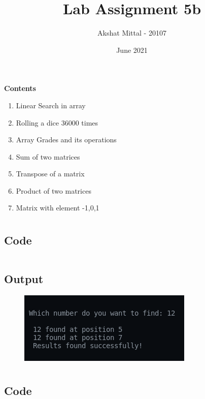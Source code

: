 \documentclass[12pt]{article}
\title{Lab Assignment 5b}
\author{Akshat Mittal - 20107}
\date{June 2021}
\begin{document}
\maketitle
\vspace{7mm}
\textbf{Contents}
\vspace{7mm}
\begin{enumerate}
    \item Linear Search in array
    \item Rolling a dice 36000 times
    \item Array Grades and its operations
    \item Sum of two matrices
    \item Transpose of a matrix
    \item Product of two matrices
    \item Matrix with element -1,0,1
\end{enumerate}

\newpage
\section{}
\subsection{Code}
\inputminted{c}{q1.c}
\subsection{Output}
\begin{figure}[h]
    \centering
    \includegraphics{1.png}
\end{figure}

\newpage
\section{}
\subsection{Code}
\inputminted{c}{q2.c}
\end{document}
